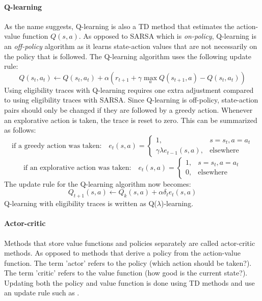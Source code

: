 \documentclass[a4paper,11pt]{mscLiterature}
\begin{document}
		\paragraph{Q-learning}
		As the name suggests, Q-learning \cite{WatkinsDayan:92} is also a TD method that estimates the action-value function $Q(s,a)$. As opposed to SARSA which is \emph{on-policy}, Q-learning is an \emph{off-policy} algorithm as it learns state-action values that are not necessarily on the policy that is followed. The Q-learning algorithm uses the following update rule:
		\begin{equation}
			Q(s_t,a_t) \leftarrow Q(s_t,a_t) + \alpha (r_{t+1} + \gamma\max_a Q(s_{t+1},a)-Q(s_t,a_t))
		\end{equation}
		Using eligibility traces with Q-learning requires one extra adjustment compared to using eligibility traces with SARSA. Since Q-learning is off-policy, state-action pairs should only be changed if they are followed by a greedy action. Whenever an explorative action is taken, the trace is reset to zero. This can be summarized as follows:
\begin{equation}
	\textrm{if a greedy action was taken:} \quad e_t(s,a) =
	\left\{
	\begin{array}{ll}
	1, & s = s_t, a = a_t   \\
	\gamma\lambda e_{t-1}(s,a), & \textrm{elsewhere}
	\end{array}
	\right.
\end{equation}
\begin{equation}
	\textrm{if an explorative action was taken:} \quad e_t(s,a) =
	\left\{
	\begin{array}{ll}
	1, & s = s_t, a = a_t   \\
	0, & \textrm{elsewhere}
	\end{array}
	\right.
\end{equation}
		The update rule for the Q-learning algorithm now becomes:
		\begin{equation}
			Q_{t+1}(s,a) \leftarrow Q_k(s,a) + \alpha\delta_t e_t(s,a)
		\end{equation}
		Q-learning with eligibility traces is written as Q($\lambda$)-learning.
		
		\paragraph{Actor-critic}
		Methods that store value functions and policies separately are called actor-critic methods. As opposed to methods that derive a policy from the action-value function. The term 'actor' refers to the policy (which action should be taken?). The term 'critic' refers to the value function (how good is the current state?). Updating both the policy and value function is done using TD methods and use an update rule such as .
			
\end{document}
